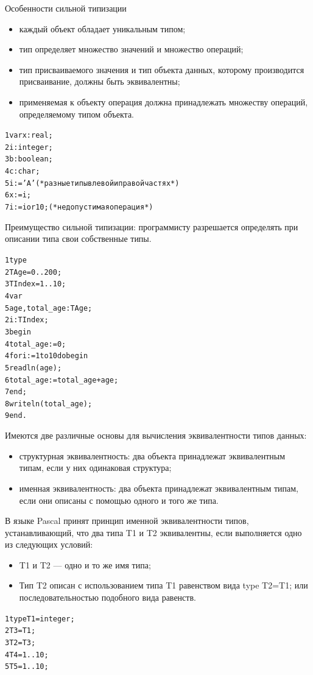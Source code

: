 \documentclass{beamer}
\begin{document}
\begin{frame}[fragile]
\begin{block}{Особенности сильной типизации}
\begin{itemize}
\item каждый объект обладает уникальным типом;
\item тип определяет множество значений и множество операций;
\item тип присваиваемого значения и тип объекта данных, которому производится присваивание, должны быть эквивалентны;
\item применяемая к объекту операция должна принадлежать множеству операций, определяемому типом объекта.
\end{itemize}
\begin{alltt}
1  var x: real;
2      i: integer;
3      b: boolean;
4      c: char;
5  i := 'A' (*разные типы в левой и правой частях*)
6  x := i;
7  i := i or 10; (*недопустимая операция*)
\end{alltt}
\end{block}
\end{frame}   

\begin{frame}[fragile]
Преимущество сильной типизации: программисту разрешается определять при описании типа свои собственные типы. 

\begin{alltt}
1  type 
2    TAge = 0..200;
3    TIndex = 1..10;
4  var 
5    age, total_age : TAge;
2    i: TIndex;
3  begin
4    total_age := 0;
4    for i := 1 to 10 do begin
5      readln(age);
6      total_age := total_age + age;
7    end;
8    writeln(total_age);
9  end.
\end{alltt}
\end{frame}
   
\begin{frame}[fragile]
Имеются две различные основы для вычисления эквивалентности типов данных:
\begin{itemize}
\item структурная эквивалентность: два объекта принадлежат эквивалентным типам, если у них одинаковая структура;
\item именная эквивалентность: два объекта принадлежат эквивалентным типам, если они описаны с помощью одного и того же типа.
\end{itemize}

В языке Pascal принят принцип именной эквивалентности типов, устанавливающий, что два типа T1 и T2 эквивалентны, если выполняется одно из следующих условий:
\begin{itemize}
\item T1 и T2 — одно и то же имя типа;
\item Тип T2 описан с использованием типа T1 равенством вида type T2=T1; или последовательностью подобного вида равенств.
\end{itemize}
\begin{alltt}
1  type T1 = integer;
2    T3 = T1;
3    T2 = T3;
4    T4 = 1..10;
5    T5 = 1..10; 	
\end{alltt}
\end{frame}   
\end{document}

